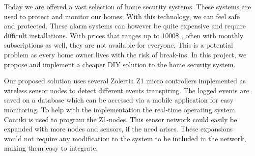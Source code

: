 

%	

Today we are offered a vast selection of home security systems. These systems are used to protect and monitor our homes. With this technology, we can feel safe and protected. These alarm systems can however be quite expensive and require difficult installations. With prices that ranges up to 1000\$ \cite{safewise}, often with monthly subscriptions as well, they are not available for everyone. This is a potential problem as every home owner lives with the risk of break-ins. 
 In this project, we propose and implement a cheaper DIY solution to the home security system.

Our proposed solution uses several Zolertia Z1 \cite{z1} micro controllers implemented as wireless sensor nodes to detect different events transpiring. The logged events are saved on a database which can be accessed via a mobile application for easy monitoring. To help with the implementation the real-time operating system Contiki \cite{contiki} is used to program the Z1-nodes. This sensor network could easily be expanded with more nodes and sensors, if the need arises. These expansions would not require any modification to the system to be included in the network, making them easy to integrate.

  

